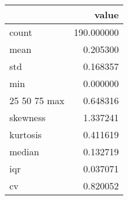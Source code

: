 \begin{tabular}{lr}
\toprule
 & value \\
\midrule
count & 190.000000 \\
mean & 0.205300 \\
std & 0.168357 \\
min & 0.000000 \\
25%
50%
75%
max & 0.648316 \\
skewness & 1.337241 \\
kurtosis & 0.411619 \\
median & 0.132719 \\
iqr & 0.037071 \\
cv & 0.820052 \\
\bottomrule
\end{tabular}

